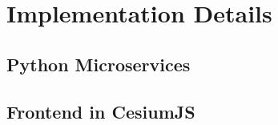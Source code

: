 \chapter{Implementation Details}%
\label{s_implementation}

\section{Python Microservices}%
\label{s_motivation}

\section{Frontend in CesiumJS}%
\label{s_contribution}